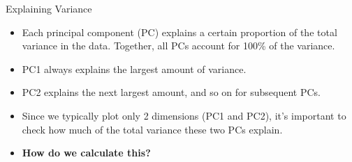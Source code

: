 \begin{frame}[allowframebreaks]{Explaining Variance}    
    \begin{itemize}
        \item Each principal component (PC) explains a certain proportion of the total variance in the data. Together, all PCs account for 100\% of the variance.
        \item PC1 always explains the largest amount of variance.
        \item PC2 explains the next largest amount, and so on for subsequent PCs.
        \item Since we typically plot only 2 dimensions (PC1 and PC2), it's important to check how much of the total variance these two PCs explain.
        \item \textbf{How do we calculate this?}
    \end{itemize}

    \framebreak


\end{frame}
